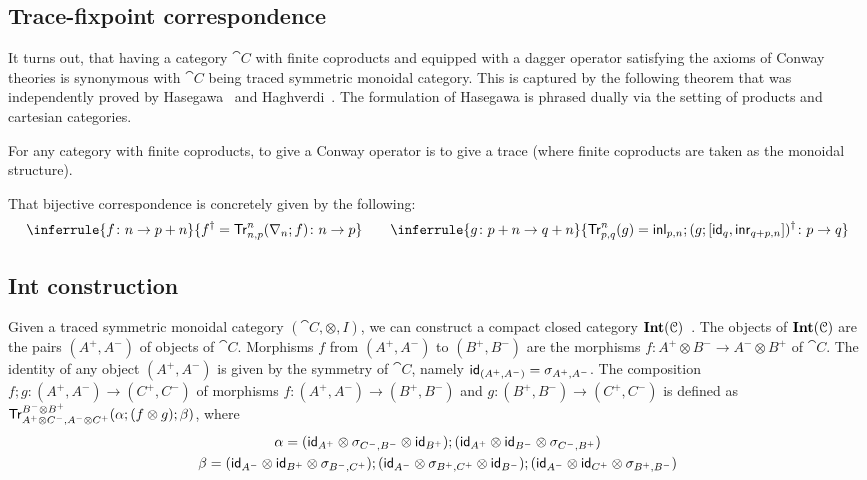 \subsection{Trace-fixpoint correspondence}
It turns out, that having a category $\cat{C}$ with finite coproducts and equipped with a dagger operator satisfying the axioms of Conway theories is synonymous with $\cat{C}$ being traced symmetric monoidal category. This is captured by the following theorem that was independently proved by Hasegawa~\cite{Hasegawa:1997:Models} and Haghverdi~\cite{Haghverdi:2000:Categorical}. The formulation of Hasegawa is phrased dually via the setting of products and cartesian categories.
\begin{theorem}\label{thm:trace}
For any category with finite coproducts, to give a Conway operator is to give a trace (where finite coproducts are taken as the monoidal structure). 
\end{theorem}
That bijective correspondence is concretely given by the following:
\begin{gather*}
	\inferrule{f \colon  n \to p + n}{f^\dagger = \Tr^n_{n,p} (\nabla_n ; f) \colon n \to p} 
	\qquad
	\inferrule{g \colon p + n \to q + n}{\Tr^{n}_{p,q}(g) = \inl_{p,n} ; (g; \lc\id_q, \inr_{q +p,n} \rc)^\dagger  \colon p \to q}
\end{gather*}	

\subsection{Int construction}\label{c3:subsec:int}
Given a traced symmetric monoidal category $(\cat{C}, \otimes, I)$, we can construct a compact closed category $\mathbf{Int}(\mathcal{C})$~\cite{Joyal:1996:Traced}. The objects of $\mathbf{Int}(\mathcal{C})$ are the pairs $(A^+,A^-)$ of objects of $\cat{C}$. Morphisms $f$ from $(A^+, A^-)$ to $(B^+, B^-)$ are the morphisms $f \colon A^+ \otimes B^- \to A^- \otimes B^+$ of $\cat{C}$. The identity of any object $(A^+, A^-)$ is given by the symmetry of $\cat{C}$, namely $\mathsf{id}_{(A^ +, A^-)} = \sigma_{A^+, A^-}$. The composition $f ; g \colon (A^+, A^-) \to (C^+, C^-)$ of morphisms $f \colon (A^+, A^-) \to (B^{+}, B^-)$ and $g \colon (B^+, B^-) \to (C^+,C^-)$ is defined as
	$
		\mathsf{Tr}^{B^- \otimes B^+}_{A^+ \otimes C^-, A^- \otimes C^+} (\alpha ; (f \otimes g) ; \beta)
	$, where \begin{gather*}\alpha = (\mathsf{id}_{A^+} \otimes \sigma_{C^-, B^-} \otimes \mathsf{id}_{B^+});(\mathsf{id}_{A^+} \otimes \mathsf{id}_{B^-} \otimes \sigma_{C^-, B^+})\\\beta = (\mathsf{id}_{A^-} \otimes \mathsf{id}_{B^+} \otimes \sigma_{B^-, C^+}); (\mathsf{id}_{A^-} \otimes \sigma_{B^+, C^+} \otimes \mathsf{id}_{B^-});(\mathsf{id}_{A^-} \otimes \mathsf{id}_{C^+} \otimes \sigma_{B^+, B^-})\end{gather*}
	
